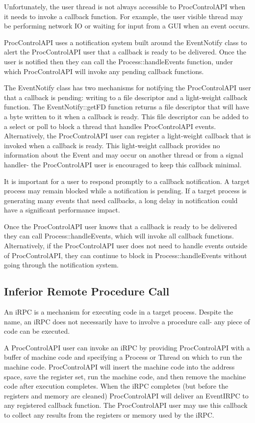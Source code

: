 Unfortunately, the user thread is not always accessible to ProcControlAPI when
it needs to invoke a callback function. For example, the user visible thread
may be performing network IO or waiting for input from a GUI when an event
occurs.

ProcControlAPI uses a notification system built around the EventNotify class to
alert the ProcControlAPI user that a callback is ready to be delivered. Once
the user is notified then they can call the Process::handleEvents function,
under which ProcControlAPI will invoke any pending callback functions.

The EventNotify class has two mechanisms for
notifying the ProcControlAPI user that a callback is pending: writing to a file
descriptor and a light-weight callback function. The
EventNotify::getFD function returns a file
descriptor that will have a byte written to it when a callback is ready. This
file descriptor can be added to a select or poll to block a thread that handles
ProcControlAPI events. Alternatively, the ProcControlAPI user can register a
light-weight callback that is invoked when a callback is ready. This
light-weight callback provides no information about the Event and may occur on
another thread or from a signal handler- the ProcControlAPI
user is encouraged to keep this callback minimal.

It is important for a user to respond promptly to a callback notification. A
target process may remain blocked while a notification is pending. If a
target process is generating many events that need callbacks, a long delay in
notification could have a significant performance impact.

Once the ProcControlAPI user knows that a callback is ready to be delivered they
can call Process::handleEvents, which will
invoke all callback functions. Alternatively, if the ProcControlAPI user does
not need to handle events outside of ProcControlAPI, they can continue to block
in Process::handleEvents without going through the notification system.

\subsection{Inferior Remote Procedure Call}
An iRPC is a mechanism for executing code in a target process. Despite the
name, an iRPC does not necessarily have to involve a procedure
call- any piece of code can be executed.

A ProcControlAPI user can invoke an iRPC by providing ProcControlAPI with a
buffer of machine code and specifying a Process or Thread on which to run the
machine code. ProcControlAPI will insert the machine code into the address
space, save the register set, run the machine code, and then remove the machine
code after execution completes. When the iRPC completes (but before the
registers and memory are cleaned) ProcControlAPI will deliver an
EventIRPC to any registered callback function. The
ProcControlAPI user may use this callback to collect any results from the
registers or memory used by the iRPC.

